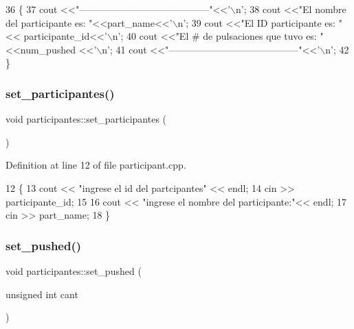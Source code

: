 \begin{DoxyCode}
36 \{
37     cout <<\textcolor{stringliteral}{"-----------------------------------------"}<<\textcolor{charliteral}{'\(\backslash\)n'};
38     cout <<\textcolor{stringliteral}{"El nombre del participante es: "}<<part\_name<<\textcolor{charliteral}{'\(\backslash\)n'};
39     cout <<\textcolor{stringliteral}{"El ID participante es: "}<< participante\_id<<\textcolor{charliteral}{'\(\backslash\)n'};
40     cout <<\textcolor{stringliteral}{"El # de pulsaciones que tuvo es: "}<<num\_pushed <<\textcolor{charliteral}{'\(\backslash\)n'}; 
41     cout <<\textcolor{stringliteral}{"-----------------------------------------"}<<\textcolor{charliteral}{'\(\backslash\)n'};
42 \}
\end{DoxyCode}
\mbox{\label{classparticipantes_a1b220cb322e21b17548d2a61b8df5125}} 
\subsubsection{\texorpdfstring{set\+\_\+participantes()}{set\_participantes()}}
{\footnotesize\ttfamily void participantes\+::set\+\_\+participantes (\begin{DoxyParamCaption}{ }\end{DoxyParamCaption})}



Definition at line 12 of file participant.\+cpp.


\begin{DoxyCode}
12                                       \{
13     cout << \textcolor{stringliteral}{"ingrese el id del partcipantes"} << endl;
14     cin >> participante\_id;
15 
16     cout << \textcolor{stringliteral}{"ingrese el nombre del participante:"}<< endl;
17     cin  >> part\_name;
18 \}
\end{DoxyCode}
\mbox{\label{classparticipantes_aab4459455c32ff7c8ce75734fb3f335a}} 
\subsubsection{\texorpdfstring{set\+\_\+pushed()}{set\_pushed()}}
{\footnotesize\ttfamily void participantes\+::set\+\_\+pushed (\begin{DoxyParamCaption}\item[{unsigned int}]{cant }\end{DoxyParamCaption})}



